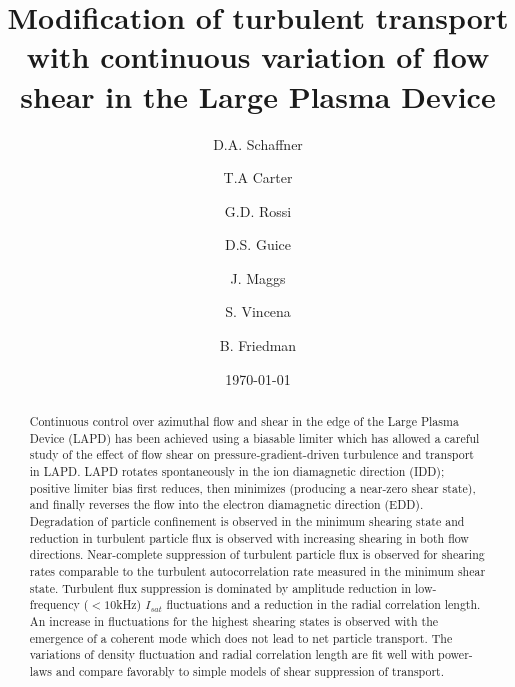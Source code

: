 \documentclass[aps,prl,amsmath,amssymb,preprint,superscriptaddress]{revtex4}
\begin{document}
\title{Modification of turbulent transport with continuous variation of
  flow shear in the Large Plasma Device}
\author{D.A. Schaffner}
\author{T.A Carter}
\author{G.D. Rossi}
\author{D.S. Guice}
\author{J. Maggs}
\author{S. Vincena}
\author{B. Friedman}


\date{\today}

\begin{abstract}
Continuous control over azimuthal flow and shear in the edge of the Large Plasma Device (LAPD) has been achieved using a biasable limiter which has allowed a careful study of the effect of flow shear on pressure-gradient-driven turbulence and transport in LAPD. LAPD rotates spontaneously in the ion diamagnetic direction (IDD); positive limiter bias first reduces, then minimizes (producing a near-zero shear state), and finally reverses the flow into the electron diamagnetic direction (EDD). Degradation of particle confinement is observed in the minimum shearing state and reduction in turbulent particle flux is observed with increasing shearing in both flow directions. Near-complete suppression of turbulent particle flux is observed for shearing rates comparable to the turbulent autocorrelation rate measured in the minimum shear state.  Turbulent flux suppression is dominated by amplitude reduction in low-frequency ($<10$kHz) $I_{sat}$ fluctuations and a reduction in the radial correlation length. An increase in fluctuations for the highest shearing states is observed with the emergence of a coherent mode which does not lead to net particle transport. The variations of density fluctuation and radial correlation length are fit well with power-laws and compare favorably to simple models of shear suppression of transport.
\end{abstract}
\end{document}
